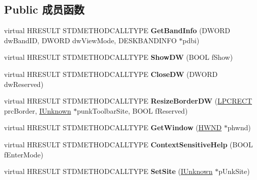 \subsection*{Public 成员函数}
\begin{DoxyCompactItemize}
\item 
\mbox{\label{class_c_menu_band_a98e66c3319358f685ebc99a6b5067963}} 
virtual H\+R\+E\+S\+U\+LT S\+T\+D\+M\+E\+T\+H\+O\+D\+C\+A\+L\+L\+T\+Y\+PE {\bfseries Get\+Band\+Info} (D\+W\+O\+RD dw\+Band\+ID, D\+W\+O\+RD dw\+View\+Mode, D\+E\+S\+K\+B\+A\+N\+D\+I\+N\+FO $\ast$pdbi)
\item 
\mbox{\label{class_c_menu_band_a3059c3f9b54dd410548a264b16073abe}} 
virtual H\+R\+E\+S\+U\+LT S\+T\+D\+M\+E\+T\+H\+O\+D\+C\+A\+L\+L\+T\+Y\+PE {\bfseries Show\+DW} (B\+O\+OL f\+Show)
\item 
\mbox{\label{class_c_menu_band_a3693dee343123fa58533f1ef75d46260}} 
virtual H\+R\+E\+S\+U\+LT S\+T\+D\+M\+E\+T\+H\+O\+D\+C\+A\+L\+L\+T\+Y\+PE {\bfseries Close\+DW} (D\+W\+O\+RD dw\+Reserved)
\item 
\mbox{\label{class_c_menu_band_aacdc6191a1a5f9e317d124fa1e5921e9}} 
virtual H\+R\+E\+S\+U\+LT S\+T\+D\+M\+E\+T\+H\+O\+D\+C\+A\+L\+L\+T\+Y\+PE {\bfseries Resize\+Border\+DW} (\hyperlink{structtag_r_e_c_t}{L\+P\+C\+R\+E\+CT} prc\+Border, \hyperlink{interface_i_unknown}{I\+Unknown} $\ast$punk\+Toolbar\+Site, B\+O\+OL f\+Reserved)
\item 
\mbox{\label{class_c_menu_band_a890648605941bc5cb65ba335ecbf6726}} 
virtual H\+R\+E\+S\+U\+LT S\+T\+D\+M\+E\+T\+H\+O\+D\+C\+A\+L\+L\+T\+Y\+PE {\bfseries Get\+Window} (\hyperlink{interfacevoid}{H\+W\+ND} $\ast$phwnd)
\item 
\mbox{\label{class_c_menu_band_ad017bebb4f487dedeca4f0890933b6eb}} 
virtual H\+R\+E\+S\+U\+LT S\+T\+D\+M\+E\+T\+H\+O\+D\+C\+A\+L\+L\+T\+Y\+PE {\bfseries Context\+Sensitive\+Help} (B\+O\+OL f\+Enter\+Mode)
\item 
\mbox{\label{class_c_menu_band_afdd8d4306dd894e8c13fbc1b592a2f35}} 
virtual H\+R\+E\+S\+U\+LT S\+T\+D\+M\+E\+T\+H\+O\+D\+C\+A\+L\+L\+T\+Y\+PE {\bfseries Set\+Site} (\hyperlink{interface_i_unknown}{I\+Unknown} $\ast$p\+Unk\+Site)

\end{DoxyCompactItemize}

